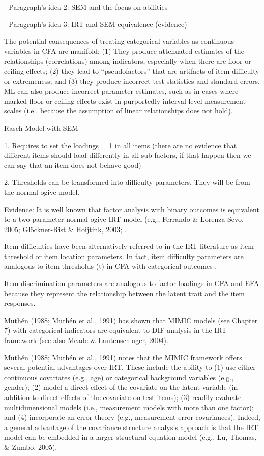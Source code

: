 - Paragraph's idea 2: SEM and the focus on abilities




- Paragraph's idea 3: IRT and SEM equivalence (evidence)

\citep{Brown_2015}
The potential consequences of treating categorical variables as continuous variables in CFA are manifold: (1) They produce attenuated estimates of the relationships (correlations) among indicators, especially when there are floor or ceiling effects; (2) they lead to “pseudofactors” that are artifacts of item difficulty or extremeness; and (3) they produce incorrect test statistics and standard errors. ML can also produce  incorrect parameter estimates, such as in cases where marked floor or ceiling effects exist in purportedly interval-level measurement scales (i.e., because the assumption of linear relationships does not hold).


Rasch Model with SEM

1. Requires to set the loadings = 1 in all items 
(there are no evidence that different items should load differently in all sub-factors, if that happen then we can say that an item does not behave good)

2. Thresholds can be transformed into difficulty parameters. They will be from the normal ogive model.


Evidence:
It is well known that factor analysis with binary outcomes is equivalent to a two-parameter normal ogive IRT model (e.g., Ferrando & Lorenza-Sevo, 2005; Glöckner-Rist & Hoijtink, 2003; \citep{Kamata_et_al_2008, Takane_et_al_1987}.

Item difficulties have been alternatively referred to in the IRT literature as item threshold or item location parameters. In fact, item difficulty parameters are analogous to item thresholds (t) in CFA with categorical outcomes \citep{Muthen_et_al_1991}.

Item discrimination parameters are analogous to factor loadings in CFA and EFA because they represent the relationship between the latent trait and the item  responses.

Muthén (1988; Muthén et al., 1991) has shown that MIMIC models (see Chapter 7) with categorical indicators are equivalent to DIF analysis in the IRT framework (see also Meade & Lautenschlager, 2004).

Muthén (1988; Muthén et al., 1991) notes that the MIMIC framework offers several potential advantages over IRT. These include the ability to (1) use either continuous covariates (e.g., age) or categorical background  variables (e.g., gender); (2) model a direct effect of the covariate on the latent variable (in addition to direct effects of the covariate on test items); (3) readily  evaluate multidimensional models (i.e., measurement models with more than one factor); and (4) incorporate an error theory (e.g., measurement error covariances). Indeed, a general advantage of the covariance structure analysis approach is that the IRT model can be  embedded in a larger structural equation model (e.g., Lu, Thomas, & Zumbo, 2005).


